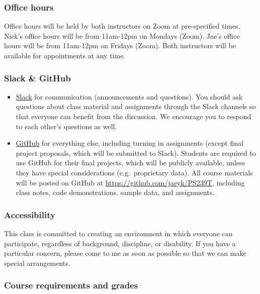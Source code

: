 \documentclass[
]{article}
\begin{document}
\hypertarget{office-hours}{%
\subsubsection{Office hours}\label{office-hours}}

Office hours will be held by both instructors on Zoom at pre-specified
times. Nick's office hours will be from 11am-12pm on Mondays (Zoom).
Jae's office hours will be from 11am-12pm on Fridays (Zoom). Both
instructors will be available for appointments at any time.

\hypertarget{slack-github}{%
\subsubsection{Slack \& GitHub}\label{slack-github}}

\begin{itemize}
\item
  \href{https://slack.com/}{Slack} for communication (announcements and
  questions). You should ask questions about class material and
  assignments through the Slack channels so that everyone can benefit
  from the discussion. We encourage you to respond to each other's
  questions as well.
\item
  \href{https://github.com/}{GitHub} for everything else, including
  turning in assignments (except final project proposals, which will be
  submitted to Slack). Students are required to use GitHub for their
  final projects, which will be publicly available, unless they have
  special considerations (e.g.~proprietary data). All course materials
  will be posted on GitHub at \url{https://github.com/jaeyk/PS239T},
  including class notes, code demonstrations, sample data, and
  assignments.
\end{itemize}

\hypertarget{accessibility}{%
\subsubsection{Accessibility}\label{accessibility}}

This class is committed to creating an environment in which everyone can
participate, regardless of background, discipline, or disability. If you
have a particular concern, please come to me as soon as possible so that
we can make special arrangements.

\hypertarget{course-requirements-and-grades}{%
\subsubsection{Course requirements and
grades}\label{course-requirements-and-grades}}
\end{document}
